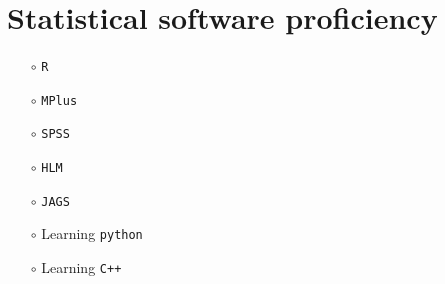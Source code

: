 \documentclass[11pt,a4paper,roman,colorlinks,linkcolor = blue]{moderncv}        %
\begin{document}
{\section{Statistical software proficiency}
{\begin{minipage}{\maincolumnwidth}%
	\small{
  \begin{itemize}
    \item[$\circ$] \texttt{R}
    \item[$\circ$] \texttt{MPlus}
    \item[$\circ$] \texttt{SPSS}
    \item[$\circ$] \texttt{HLM}
    \item[$\circ$] \texttt{JAGS}
    \item[$\circ$] Learning \texttt{python}
    \item[$\circ$] Learning \texttt{C++}
  \end{itemize}}
\end{minipage}}
}
\end{document}
